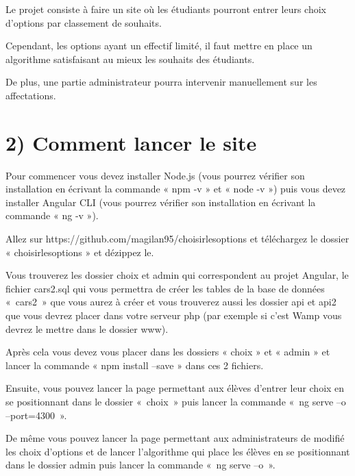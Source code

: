 \documentclass[12pt]{article}
\begin{document}
\vspace{\baselineskip}
Le projet consiste à faire un site où les étudiants pourront entrer leurs choix d’options par classement de souhaits.\par

Cependant, les options ayant un effectif limité, il faut mettre en place un algorithme satisfaisant au mieux les souhaits des étudiants.\par

De plus, une partie administrateur pourra intervenir manuellement sur les affectations.\par


\vspace{\baselineskip}
\section*{2) Comment lancer le site}

\vspace{\baselineskip}
Pour commencer vous devez installer Node.js (vous pourrez vérifier son installation en écrivant la commande « npm -v » et « node -v ») puis vous devez installer Angular CLI (vous pourrez vérifier son installation en écrivant la commande « ng -v »).\par

Allez sur https://github.com/magilan95/choisirlesoptions et téléchargez le dossier « choisirlesoptions » et dézippez le.\par

Vous trouverez les dossier choix et admin qui correspondent au projet Angular, le fichier cars2.sql qui vous permettra de créer les tables de la base de données « cars2 » que vous aurez à créer et vous trouverez aussi les dossier api et api2 que vous devrez placer dans votre serveur php (par exemple si c’est Wamp vous devrez le mettre dans le dossier www).\par

Après cela vous devez vous placer dans les dossiers « choix » et « admin » et lancer la commande « npm install –save » dans ces 2 fichiers.\par

Ensuite, vous pouvez lancer la page permettant aux élèves d’entrer leur choix en se positionnant dans le dossier « choix » puis lancer la commande « ng serve --o –port=4300 ».\par

De même vous pouvez lancer la page permettant aux administrateurs de modifié les choix d’options et de lancer l’algorithme qui place les élèves en se positionnant dans le dossier admin puis lancer la commande « ng serve --o ». \par
\end{document}
